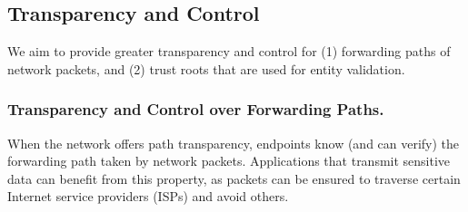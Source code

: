 \documentclass[a4paper]{llncs}
\begin{document}
\subsection{Transparency and Control}



We aim to provide greater transparency and control for (1)
forwarding paths of network packets, and (2) trust roots that are used
for entity validation.

\subsubsection{Transparency and Control over Forwarding Paths.}

When the network offers path transparency, endpoints know (and can verify) the
forwarding path taken by network packets. Applications that transmit sensitive
data can benefit from this property, as packets can be ensured to traverse
certain Internet service providers (ISPs) and avoid others.
\end{document}
